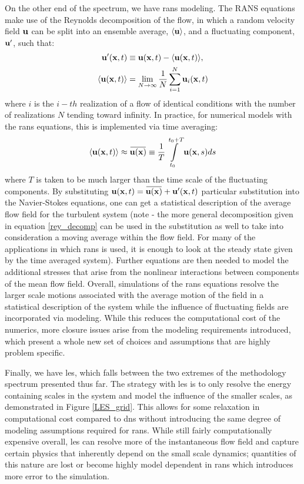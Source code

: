 On the other end of the spectrum, we have \gls{rans} modeling. The RANS equations make use of the Reynolds decomposition of the flow, in which a random velocity field $\vb{u}$ can be split into an ensemble average, $\langle \vb{u}\rangle$, and a fluctuating component, $\vb{u}'$, such that: 
\begin{equation}\label{rey_decomp}
\begin{aligned}
\vb{u}'(\vb{x},t) & \equiv \vb{u}(\vb{x}, t) - \langle \vb{u}(\vb{x}, t)\rangle, \\
\langle \vb{u}(\vb{x},t)\rangle & = \lim_{N \to \infty}\dfrac{1}{N} \sum\limits_{i=1}^{N} \vb{u}_i(\vb{x}, t)
\end{aligned}
\end{equation}   
where $i$ is the $i-th$ realization of a flow of identical conditions with the number of realizations $N$ tending toward infinity. In practice, for numerical models with the \gls{rans} equations, this is implemented via time averaging: 
$$\langle \vb{u}(\vb{x}, t) \rangle \approx \overbar{\vb{u}(\vb{x})} \equiv \dfrac{1}{T} \int\limits_{t_0}^{t_0+T} \vb{u}(\vb{x}, s) ds$$
where $T$ is taken to be much larger than the time scale of the fluctuating components. By substituting $\vb{u}(\vb{x},t) = \overbar{\vb{u}(\vb{x})} + \vb{u}'(\vb{x}, t)$ particular substitution into the Navier-Stokes equations, one can get a statistical description of the average flow field for the turbulent system (note - the more general decomposition given in equation \eqref{rey_decomp} can be used in the substitution as well to take into consideration a moving average within the flow field. For many of the applications in which \gls{rans} is used, it is enough to look at the steady state given by the time averaged system). Further equations are then needed to model the additional stresses that arise from the nonlinear interactions between components of the mean flow field. Overall, simulations of the \gls{rans} equations resolve the larger scale motions associated with the average motion of the field in a statistical description of the system while the influence of fluctuating fields are incorporated via modeling. While this reduces the computational cost of the numerics, more closure issues arise from the modeling requirements introduced, which present a whole new set of choices and assumptions that are highly problem specific. 

Finally, we have \gls{les}, which falls between the two extremes of the methodology spectrum presented thus far. The strategy with \gls{les} is to only resolve the energy containing scales in the system and model the influence of the smaller scales, as demonstrated in Figure \ref{LES_grid}. This allows for some relaxation in computational cost compared to \gls{dns} without introducing the same degree of modeling assumptions required for \gls{rans}. While still fairly computationally expensive overall, \gls{les} can resolve more of the instantaneous flow field and capture certain physics that inherently depend on the small scale dynamics; quantities of this nature are lost or become highly model dependent in \gls{rans} which introduces more error to the simulation. 

